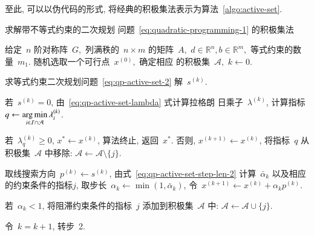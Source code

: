 至此, 可以以伪代码的形式, 将经典的积极集法表示为算法~\ref{algo:active-set}.
\begin{algorithm}[htbp]
\caption{求解带不等式约束的二次规划
问题~\eqref{eq:quadratic-programming-1} 的积极集法}\label{algo:active-set}
\begin{algorithmic}[1]
\STATE 给定~$n$ 阶对称阵~$G,$ 列满秩的~$n \times m$ 的矩阵~$A,$ ${d} \in \mathbb{R}^n, {b} \in \mathbb{R}^m,$ 等式约束的数量~$m_1$. 随机选取一个可行点~${x}^{(0)},$ 确定相应
的积极集~$\mathcal{A},$ $k \gets 0.$

\STATE 求等式约束二次规划问题~\eqref{eq:qp-active-set-2} 解~${s}^{(k)}$.

\STATE 若~${s}^{(k)} = 0$, 由~\eqref{eq:qp-active-set-lambda} 式计算拉格朗
日乘子~${\lambda}^{(k)}$, 计算指标~$q \gets \operatorname*{arg\,min}\limits_{i \in \mathcal{I} \cap \mathcal{A}} \lambda_i^{(k)}$.

\STATE 若~$\lambda^{(k)}_q \geqslant 0$, ${x}^* \gets {x}^{(k)}$, 算法终止, 返回~${x}^*$. 否则, ${x}^{(k+1)} \gets {x}^{(k)}$, 将指标~$q$ 从积极集~$\mathcal{A}$ 中移除: $\mathcal{A} \gets \mathcal{A} \setminus \{ j \}$.

\STATE 取线搜索方向~${p}^{(k)} \gets {s}^{(k)}$, 由式~\eqref{eq:qp-active-set-step-len-2} 
计算~$\bar{\alpha}_k$ 以及相应的约束条件的指标$j$, 取步长~$\alpha_k \gets \min (1, \bar{\alpha}_k)$, 令~${x}^{(k+1)} \gets {x}^{(k)} + \alpha_k {p}^{(k)}$.


\STATE 若~$\alpha_k < 1$, 将阻滞约束条件的指标~$j$ 添加到积极集~$\mathcal{A}$ 中: $\mathcal{A} \gets \mathcal{A} \cup \{ j \}$. 

\STATE 令~$k=k+1$, 转步~2.
\end{algorithmic}
\end{algorithm}

